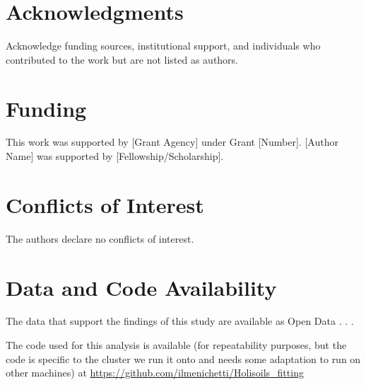 \documentclass[12pt,a4paper]{article}
\begin{document}
\section*{Acknowledgments}

Acknowledge funding sources, institutional support, and individuals who contributed to the work but are not listed as authors.


\section*{Funding}

This work was supported by [Grant Agency] under Grant [Number]. [Author Name] was supported by [Fellowship/Scholarship].


\section*{Conflicts of Interest}

The authors declare no conflicts of interest.


\section*{Data and Code Availability}

The data that support the findings of this study are available as Open Data . . .

The code used for this analysis is available (for repeatability purposes, but the code is specific to the cluster we run it onto and needs some adaptation to run on other machines) at \url{https://github.com/ilmenichetti/Holisoils_fitting}







\end{document}
